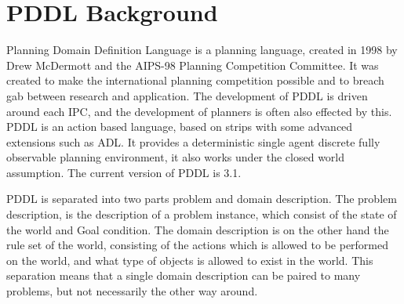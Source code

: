 \section{PDDL \textbf{Background}}
Planning Domain Definition Language is a planning language, created in 1998 by Drew McDermott and the AIPS-98 Planning Competition Committee. It was created to make the international planning competition possible and to breach gab between research and application. The development of PDDL is driven around each IPC, and the  development of planners is often also effected by this.
PDDL is an action based language, based on strips with some advanced extensions such as ADL. It provides a deterministic single agent discrete fully observable planning environment, it also works under the closed world assumption. The current version of PDDL is 3.1.

PDDL is separated into two parts problem and domain description. The problem description, is the description of a problem instance, which consist of the state of the world and Goal condition. The domain description is on the other hand the rule set of the world, consisting of the actions which is allowed to be performed on the world, and what type of objects is allowed to exist in the world. This separation means that a single domain description can be paired to many problems, but not necessarily the other way around.

